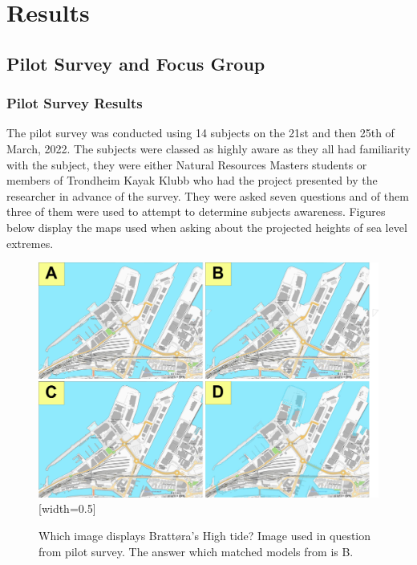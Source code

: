 \chapter{Results}

\section{Pilot Survey and Focus Group}

\subsection{Pilot Survey Results}
The pilot survey was conducted using 14 subjects on the 21st and then 25th of March, 2022. The subjects were classed as highly aware as they all had familiarity with the subject, they were either Natural Resources Masters students or members of Trondheim Kayak Klubb who had the project presented by the researcher in advance of the survey. They were asked seven questions and of them three of them were used to attempt to determine subjects awareness. Figures below display the maps used when asking about the projected heights of sea level extremes.

\begin{figure} [h]
    \centering
    \includegraphics{fig/brattora question on 2022 high tide quadrant.png}[width=0.5\textwidth]
    \caption{Which image displays Brattøra's High tide? Image used in question from pilot survey. The answer which matched models from \cite{kartverket_se_2021} is B.}
    \label{fig:Brattora_2022_hightide}
\end{figure}

